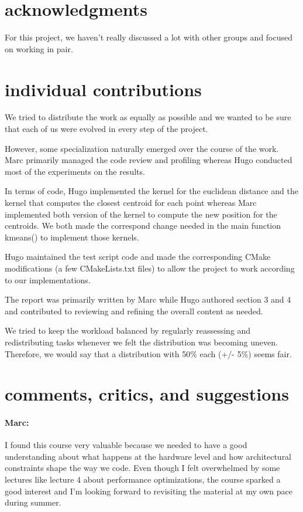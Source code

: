 \documentclass[sigconf]{acmart}
\begin{document}
\section{acknowledgments}

For this project, we haven't really discussed a lot with other groups and focused on working in pair. 

\section{individual contributions}
We tried to distribute the work as equally as possible and we wanted to be sure that each of us were evolved in every step of the project.

However, some specialization naturally emerged over the course of the work. Marc primarily managed the code review and profiling whereas Hugo conducted most of the experiments on the results.

In terms of code, Hugo implemented the kernel for the euclidean distance and the kernel that computes the closest centroid for each point whereas Marc implemented both version of the kernel to compute the new position for the centroids. We both made the correspond change needed in the main function kmeans() to implement those kernels.

Hugo maintained the test script code and made the corresponding CMake modifications (a few CMakeLists.txt files) to allow the project to work according to our implementations.

The report was primarily written by Marc while Hugo authored section 3 and 4 and contributed to reviewing and refining the overall content as needed.

We tried to keep the workload balanced by regularly reassessing and redistributing tasks whenever we felt the distribution was becoming uneven. Therefore, we would say that a distribution with 50\% each (+/- 5\%) seems fair.

\section{comments, critics, and suggestions}

\paragraph{Marc:} I found this course very valuable because we needed to have a good understanding about what happens at the hardware level and how architectural constraints shape the way we code. Even though I felt overwhelmed by some lectures like lecture 4 about performance optimizations, the course sparked a good interest and I'm looking forward to revisiting the material at my own pace during summer.



\end{document}
